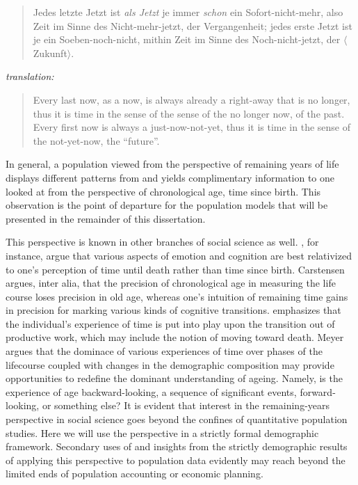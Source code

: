  \FloatBarrier
 \label{ch:newpersp}
\begin{singlespace}
\begin{quote}
Jedes letzte Jetzt ist \textit{als Jetzt} je immer \textit{schon} ein
Sofort-nicht-mehr, also Zeit im Sinne des Nicht-mehr-jetzt, der Vergangenheit;
jedes erste Jetzt ist je ein Soeben-noch-nicht, mithin Zeit im Sinne des
Noch-nicht-jetzt, der $\langle$Zukunft$\rangle$.
\citep[p424][]{heidegger1977sein}
\end{quote}
\textit{translation:}
\begin{quote}
Every last now, as a now, is always already a right-away that is no longer, thus
it is time in the sense of the sense of the no longer now, of the past. Every
first now is always a just-now-not-yet, thus it is time in the sense of the
not-yet-now, the ``future''. \citep{stambaugh1996being}
\end{quote}
\end{singlespace}

In general, a population viewed from the
perspective of remaining years of life displays different patterns 
from and yields complimentary information to one looked at from the
perspective of chronological age, time since birth. This observation is the
point of departure for the population models that will be presented in the remainder of this
dissertation. 

This perspective is known in other branches of social science as well.
 \citet{carstensen2006influence,carstensen1999taking}, 
for instance, argue that various aspects of emotion and cognition are best 
relativized to one's perception of time until
death rather than time since birth. Carstensen argues, inter alia, that the
precision of chronological age in measuring the life course loses precision in old age,
whereas one's intuition of remaining time gains in precision for marking various
kinds of cognitive transitions. \citet{meyer2008altern} emphasizes that the
individual's experience of time is put into play upon the transition out of
productive work, which may include the notion of moving toward death. Meyer
argues that the dominace of various experiences of time over phases of the
lifecourse coupled with changes in the demographic composition may provide
opportunities to redefine the dominant understanding of ageing. Namely, is
the experience of age backward-looking, a sequence of significant events,
forward-looking, or something else? It is evident that interest in the
remaining-years perspective in social science goes beyond the
confines of quantitative population studies. Here we will use the perspective in
a strictly formal demographic framework. Secondary uses of and insights from the
strictly demographic results of applying this perspective to population data
evidently may reach beyond the limited ends of population accounting or
economic planning.

